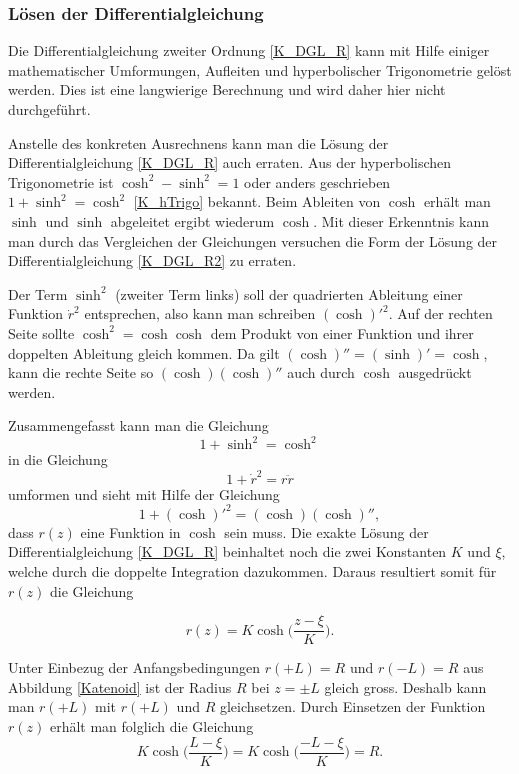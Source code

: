 \begin{refsection}
\subsubsection{Lösen der Differentialgleichung}
Die Differentialgleichung zweiter Ordnung \eqref{K_DGL_R} kann mit Hilfe einiger mathematischer Umformungen, Aufleiten und hyperbolischer Trigonometrie gelöst werden. 
Dies ist eine langwierige Berechnung und wird daher hier nicht durchgeführt.

Anstelle des konkreten Ausrechnens kann man die Lösung der Differentialgleichung \eqref{K_DGL_R} auch erraten. 
Aus der hyperbolischen Trigonometrie ist $\cosh^2-\sinh^2=1$ oder anders geschrieben $1+\sinh^2=\cosh^2$ \eqref{K_hTrigo} bekannt. 
Beim Ableiten von $\cosh$ erhält man $\sinh$ und $\sinh$ abgeleitet ergibt wiederum $\cosh$. 
Mit dieser Erkenntnis kann man durch das Vergleichen der Gleichungen versuchen die Form der Lösung der Differentialgleichung \eqref{K_DGL_R2} zu erraten. 

Der Term $\sinh^2$  (zweiter Term links) soll der quadrierten Ableitung einer Funktion ${\dot {r}}^2$ entsprechen, also kann man schreiben $(\cosh)'^2$. 
Auf der rechten Seite sollte $\cosh^2=\cosh \cosh$ dem Produkt von einer Funktion und ihrer doppelten Ableitung gleich kommen. Da gilt $(\cosh)''=(\sinh)'=\cosh$, kann die rechte Seite so $(\cosh) (\cosh)''$ auch durch $\cosh$ ausgedrückt werden.


Zusammengefasst kann man die Gleichung 
\begin{equation} \label{K_hTrigo}
1+\sinh^2=\cosh^2
\end{equation}
 in die Gleichung 
 \begin{equation} \label{K_DGL_R2}
1+{\dot {r}}^2=r  \ddot{r}
\end{equation}
 umformen und sieht mit Hilfe der Gleichung 
\begin{equation} \label{K_hTrigoU}
1+(\cosh)'^2=(\cosh) (\cosh)'' ,
\end{equation}
dass $r(z)$ eine Funktion in $\cosh$ sein muss.
Die exakte Lösung der Differentialgleichung \eqref{K_DGL_R} beinhaltet noch die zwei Konstanten $K$ und $\xi$, welche durch die doppelte Integration dazukommen. Daraus resultiert somit für $r(z)$ die Gleichung 

\begin{equation} \label{K_r}
r(z)=K \cosh\bigg(\frac{z-\xi}{K}\bigg) .
\end{equation}

Unter Einbezug der Anfangsbedingungen $r(+L)=R$ und $r(-L)=R$ aus Abbildung \ref{Katenoid} ist der Radius $R$ bei $z= \pm L$ gleich gross. Deshalb kann man $r(+L)$ mit $r(+L)$ und $R$ gleichsetzen. Durch Einsetzen der Funktion $r(z)$ erhält man folglich die Gleichung
\begin{equation} \label{K_rL}
K \cosh\bigg(\frac{L-\xi}{K}\bigg)=K \cosh\bigg(\frac{-L-\xi}{K}\bigg)=R .
\end{equation}


\end{refsection}
